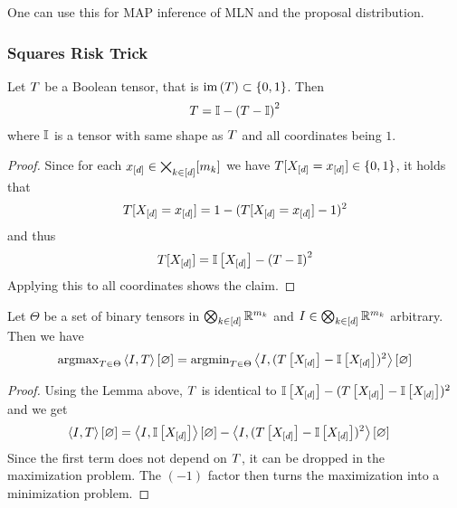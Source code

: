 One can use this for MAP inference of MLN and the proposal distribution.


\subsubsection{Squares Risk Trick}

\begin{lemma}
	Let $T$ be a Boolean tensor, that is $\mathrm{im}\left(T\right)\subset\{0,1\}$.
	Then
		\[ T = \mathbb{I} - \left( T - \mathbb{I} \right)^2  \]
	where $\mathbb{I}$ is a tensor with same shape as $T$ and all coordinates being $1$.
\end{lemma}
\begin{proof}
	Since for each $x_{[d]}\in\bigtimes_{k\in[d]}[m_{k}]$ we have $T[X_{[d]}=x_{[d]}]\in\{0,1\}$, it holds that
		\[ T[X_{[d]}=x_{[d]}] = 1 - (T[X_{[d]}=x_{[d]}]-1)^2 \]
	and thus
		\[ T[X_{[d]}] = \mathbb{I}\left[X_{[d]}\right] - \left( T - \mathbb{I} \right)^2  \]
	Applying this to all coordinates shows the claim.
\end{proof}




\begin{theorem}\label{the:reweightedLeastSquares}
	Let $\Theta$ be a set of binary tensors in $\bigotimes_{k\in[d]} \mathbb{R}^{m_{k}}$ and $I\in\bigotimes_{k\in[d]} \mathbb{R}^{m_{k}}$ arbitrary.
	Then we have
	\begin{align}
		\mathrm{argmax}_{T\in\Theta} \left\langle I,T\right\rangle \left[ \varnothing \right] 
		= \mathrm{argmin}_{T\in\Theta} \left\langle I, (T\left[X_{[d]}\right]-\mathbb{I}\left[X_{[d]}\right])^2\right\rangle \left[ \varnothing \right]
	\end{align} 
\end{theorem}
\begin{proof}
	Using the Lemma above, $T$ is identical to $\mathbb{I}\left[X_{[d]}\right]-(T\left[X_{[d]}\right]-\mathbb{I}\left[X_{[d]}\right])^2$ and we get
	\begin{align*}
		 \left\langle I,T\right\rangle \left[ \varnothing \right] 
		 &=  \left\langle I,\mathbb{I}\left[X_{[d]}\right]\right\rangle \left[ \varnothing \right]-\left\langle I,(T\left[X_{[d]}\right]-\mathbb{I}\left[X_{[d]}\right])^2\right\rangle \left[ \varnothing \right] 
	\end{align*}
	Since the first term does not depend on $T$, it can be dropped in the maximization problem.
	The $(-1)$ factor then turns the maximization into a minimization problem.
\end{proof}

